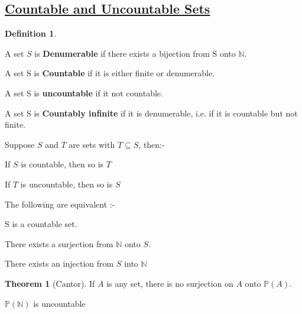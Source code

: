 \documentclass{article}
\theoremstyle{definition}
\newtheorem*{defi}{Definition}
\theoremstyle{definition}
\newenvironment{manualprop}[1]{%
  \renewcommand\themanualpropinner{#1}%
  \manualpropinner
}{\endmanualpropinner}
\newenvironment{manualcoro}[1]{%
  \renewcommand\themanualcoroinner{#1}%
  \manualcoroinner
}{\endmanualcoroinner}
\theoremstyle{named}
\newtheorem*{namedtheorem}{Theorem}
\begin{document}
\subsection{\underline{Countable and Uncountable Sets}}
\begin{defi}
\begin{citemize}
    \item A set $S$ is \textbf{Denumerable} if there exists a bijection from S onto $\mathbb{N}$.
    \item A set S is \textbf{Countable} if it is either finite or denumerable.
    \item A set S is \textbf{uncountable} if it not countable.
    \item A set S is \textbf{Countably infinite} if it is denumerable, i.e. if it is countable but not finite. 
\end{citemize}
\end{defi}

\begin{manualprop}{24}
    Suppose $S$ and $T$ are sets with $T \subseteq S$, then:-
    \begin{citemize}
        \item If $S$ is countable, then so is $T$
        \item If $T$ is uncountable, then so is $S$
    \end{citemize}

\end{manualprop}

\begin{manualprop} {25}
    The following are equivalent :-
    \begin{citemize}
        \item S is a countable set.
        \item There exists a surjection from $\mathbb{N}$ onto $S$.
        \item There exists an injection from $S$ into $\mathbb{N}$
    \end{citemize}
\end{manualprop}

\begin{namedtheorem}[Cantor]
    If $A$ is any set, there is no surjection on $A$ onto $\mathbb{P}(A)$.
\end{namedtheorem}

\begin{manualcoro}{5.1}
    $\mathbb{P}(\mathbb{N})$ is uncountable
\end{manualcoro}
\end{document}
